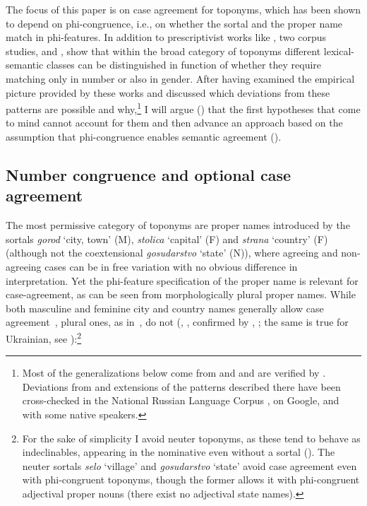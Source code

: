 \documentclass[output=paper,colorlinks,citecolor=brown]{langscibook}
\begin{document}
The focus of this paper is on case agreement for toponyms, which has been shown to depend on phi-congruence, i.e., on whether the sortal and the proper name match in phi-features. In addition to prescriptivist works like \citet{RozentalKabanova1998}, two corpus studies, \citet{GraudinaKatlinskaja1976} and \citet{Logvinova2018}, show that within the broad category of toponyms different lexical-semantic classes can be distinguished in function of whether they require matching only in number or also in gender. After having examined the empirical picture provided by these works and discussed which deviations from these patterns are possible and why,\footnote{Most of the generalizations below come from \citet{GraudinaKatlinskaja1976} and \citet{RozentalKabanova1998} and are verified by \citet{Logvinova2018, LogvinovaInPress}. Deviations from and extensions of the patterns described there have been cross-checked in the National Russian Language Corpus \citep{RNC}, on Google, and with some native speakers.} I will argue () that the first hypotheses that come to mind cannot account for them and then advance an approach based on the assumption that phi-congruence enables semantic agreement ().

\subsection{Number congruence and optional case agreement}\label{mat:sec:number-congruence-case-agreement}

The most permissive category of toponyms are proper names introduced by the sortals \textit{gorod} ‘city, town’ (M), \textit{stolica} ‘capital’ (F) and \textit{strana} ‘country’ (F) (although not the coextensional \textit{gosudarstvo} ‘state’ (N)), where agreeing and non-agreeing cases can be in free variation with no obvious difference in interpretation. Yet the phi-feature specification of the proper name is relevant for case-agreement, as can be seen from morphologically plural proper names. While both masculine and feminine city and country names generally allow case agreement~, plural ones, as in~, do not (\citealt[141]{GraudinaKatlinskaja1976}, \citealt[281]{RozentalKabanova1998}, confirmed by \citealt[25--28]{Logvinova2018}, \citeyear{LogvinovaInPress}; the same is true for Ukrainian, see \citealt{Gorpinic1987}):\footnote{\label{mat:foot:ForTheSakeOfSimplicity}For the sake of simplicity I avoid neuter toponyms, as these tend to behave as indeclinables, appearing in the nominative even without a sortal (\citealt[138--140]{GraudinaKatlinskaja1976}). The neuter sortals \textit{selo} ‘village’ and \textit{gosudarstvo} ‘state’ avoid case agreement even with phi-congruent toponyms, though the former allows it with phi-congruent adjectival proper nouns (there exist no adjectival state names).} 
\end{document}
